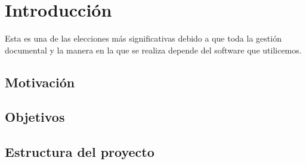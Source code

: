 \chapter{Introducción}

Esta es una de las elecciones más significativas debido a que toda la gestión documental
y la manera en la que se realiza depende del software que utilicemos.
\\

\section{Motivación}

\section{Objetivos}

\section{Estructura del proyecto}
